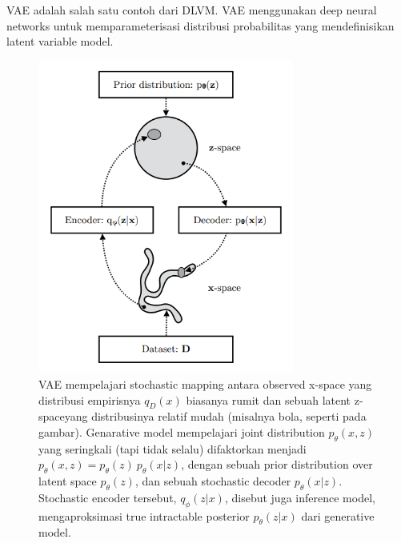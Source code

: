 \documentclass{article}
\begin{document}
VAE adalah salah satu contoh dari DLVM. VAE menggunakan deep neural networks untuk memparameterisasi distribusi probabilitas yang mendefinisikan latent variable model.
\begin{figure}[h]
    \centering
    \includegraphics[width=0.75\textwidth]{fig/vae.png}
    \caption{
	VAE mempelajari stochastic mapping antara observed x-space yang distribusi empirisnya $ q_D(x) $ biasanya rumit dan sebuah latent z-spaceyang distribusinya relatif mudah (misalnya bola, seperti pada gambar). Genarative model mempelajari joint distribution $ p_\theta(x, z) $ yang seringkali (tapi tidak selalu)
	difaktorkan menjadi $ p_\theta(x, z) = p_\theta(z) \ p_\theta(x|z) $, dengan sebuah prior distribution over latent space
	$ p_\theta(z) $, dan sebuah stochastic decoder $ p_\theta(x|z) $. Stochastic encoder tersebut, $ q_\phi(z|x) $, disebut juga
	inference model, mengaproksimasi true intractable posterior $ p_\theta(z|x) $ dari generative model.
    }
    \label{fig:vae}
\end{figure}
\end{document}
